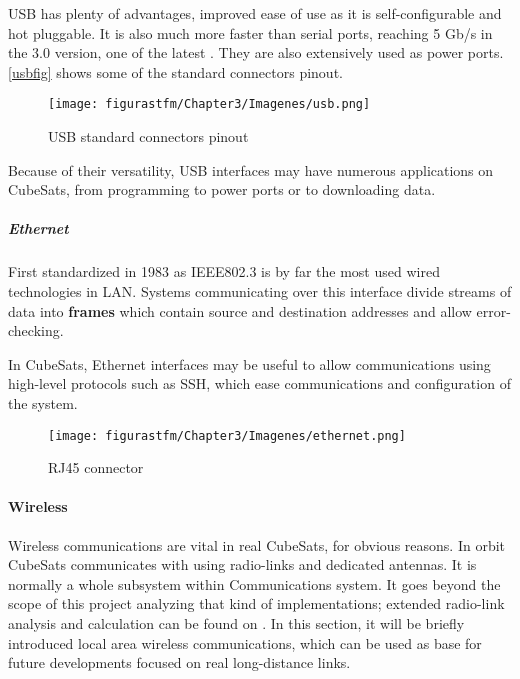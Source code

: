 \acrshort{USB} has plenty of advantages, improved ease of use as it is self-configurable and hot pluggable. It is also much more faster than serial ports, reaching 5 Gb/s in the 3.0 version, one of the latest \cite{wiki}. They are also extensively used as power ports. \autoref{usbfig} shows some of the standard connectors pinout.

			\begin{figure} [H] 				
				\centering
				\texttt{[image: figurastfm/Chapter3/Imagenes/usb.png]}
				\caption{USB standard connectors pinout \cite{wiki}} \label{usbfig}
				\vspace{-0.5cm}
			\end{figure}

Because of their versatility, \acrshort{USB} interfaces may have numerous applications on CubeSats, from programming to power ports or to downloading data.

\subparagraph{Ethernet}

First standardized in 1983 as \acrshort{IEEE}802.3 is by far the most used wired technologies in \acrshort{LAN}. Systems communicating over this interface divide streams of data into \textbf{frames} which contain source and destination addresses and allow error-checking. 

In CubeSats, Ethernet interfaces may be useful to allow communications using high-level protocols such as \acrshort{SSH}, which ease communications and configuration of the system.

			\begin{figure} [H] 				
				\centering
				\texttt{[image: figurastfm/Chapter3/Imagenes/ethernet.png]}
				\caption{RJ45 connector \cite{ethernet}}
				\vspace{-2cm}
			\end{figure}


\paragraph{Wireless}

Wireless communications are vital in real CubeSats, for obvious reasons. In orbit CubeSats communicates with  using radio-links and dedicated antennas. It is normally a whole subsystem within Communications system. It goes beyond the scope of this project analyzing that kind of implementations; extended radio-link analysis and calculation can be found on \cite{tfg}. In this section, it will be briefly introduced local area wireless communications, which can be used as base for future developments focused on real long-distance links.

